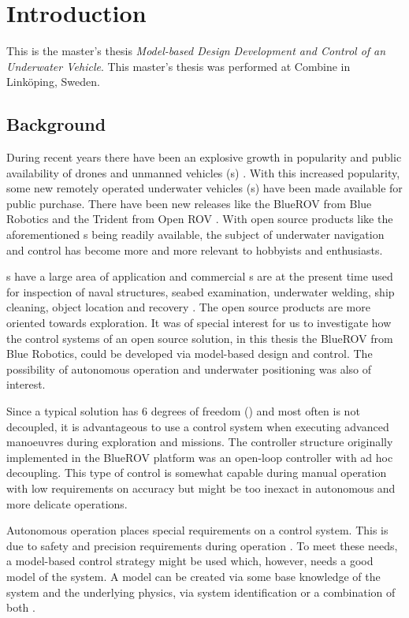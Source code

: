 \chapter{Introduction}\label{cha:intro}
This is the master's thesis \textit{Model-based Design Development and Control of an Underwater Vehicle}.
This master's thesis was performed at Combine in Linköping, Sweden.

\section{Background}
During recent years there have been an explosive growth in popularity and public availability of drones and unmanned vehicles (\abbrUV{}s) \citep{popmechanics}. With this increased popularity, some new remotely operated underwater vehicles (\abbrROV{}s) have been made available for public purchase. There have been new releases like the BlueROV from Blue Robotics \citep{bluerobotics} and the Trident from Open ROV \citep{openrov}. With open source products like the aforementioned \abbrROV{}s being readily available, the subject of underwater navigation and control has become more and more relevant to hobbyists and enthusiasts.

\abbrROV{}s have a large area of application and commercial \abbrROV{}s are at the present time used for inspection of naval structures, seabed examination, underwater welding, ship cleaning, object location and recovery \citep{saab}. The open source products are more oriented towards exploration. It was of special interest for us to investigate how the control systems of an open source \abbrROV solution, in this thesis the BlueROV from Blue Robotics, could be developed via model-based design and control. The possibility of autonomous operation and underwater positioning was also of interest.

Since a typical \abbrROV solution has 6 degrees of freedom (\abbrDOF) and most often is not decoupled, it is advantageous to use a control system when executing advanced manoeuvres during exploration and missions. The controller structure originally implemented in the BlueROV platform was an open-loop controller with ad hoc decoupling. This type of control is somewhat capable during manual operation with low requirements on accuracy but might be too inexact in autonomous and more delicate operations. 

Autonomous operation places special requirements on a control system. This is due to safety and precision requirements during operation \citep[p. 416]{safety}. To meet these needs, a model-based control strategy might be used which, however, needs a good model of the system. A model can be created via some base knowledge of the system and the underlying physics, via system identification or a combination of both \citep{modellbygge}. 

